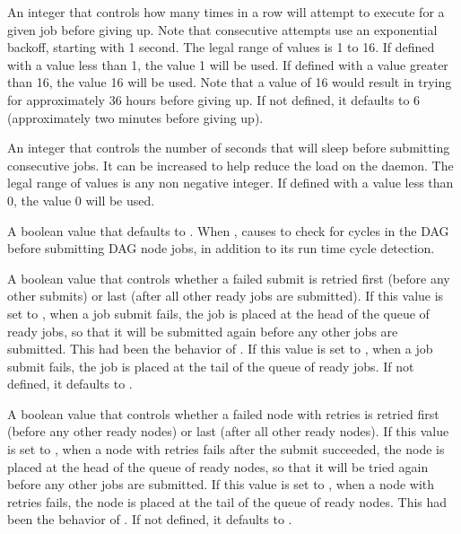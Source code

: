 \begin{description}
\label{param:DAGManMaxSubmitAttempts}
\item[\Macro{DAGMAN\_MAX\_SUBMIT\_ATTEMPTS}]
  An integer that controls how
  many times in a row  will attempt to execute
   for a given job before giving up.
  Note that consecutive attempts use an exponential backoff,
  starting with 1 second.
  The legal range of values is 1 to 16.
  If defined with a value less than 1, the  value 1 will be used.
  If defined with a value greater than 16, the value 16 will be used.
  Note that a value of 16 would result in  trying for
  approximately 36 hours before giving up.
  If not defined,
  it defaults to 6 (approximately two minutes before giving up).

\label{param:DAGManSubmitDelay}
\item[\Macro{DAGMAN\_SUBMIT\_DELAY}]
  An integer that controls the number of seconds that 
  will sleep before submitting consecutive jobs.  It can be increased to
  help reduce the load on the  daemon.  The legal range
  of values is any non negative integer.  If defined with a value less
  than 0, the value 0 will be used.

\label{param:DAGManStartupCycleDetect}
\item[\Macro{DAGMAN\_STARTUP\_CYCLE\_DETECT}]
  A boolean value that defaults to .
  When ,
  causes  to check for cycles in the DAG before
  submitting DAG node jobs,
  in addition to its run time cycle detection.

\label{param:DAGManRetrySubmitFirst}
\item[\Macro{DAGMAN\_RETRY\_SUBMIT\_FIRST}]
  A boolean value that controls whether a failed submit is retried first
  (before any other submits) or last (after all other ready jobs are
  submitted).  If this value is set to , when a job submit
  fails, the job is placed at the head of the queue of ready jobs, so
  that it will be submitted again before any other jobs are submitted.
  This had been the behavior of .
  If this value is set to , when a job submit fails, the job
  is placed at the tail of the queue of ready jobs.
  If not defined, it defaults to .

\label{param:DAGManRetryNodeFirst}
\item[\Macro{DAGMAN\_RETRY\_NODE\_FIRST}]
  A boolean value that controls whether a failed node with retries
  is retried first (before any other ready nodes) or last (after all
  other ready nodes).  If this value is set to , when a
  node with retries fails after the submit succeeded, the node is
  placed at the head of the queue of ready nodes, so that it will be
  tried again before any other jobs are submitted.  If this value is
  set to , when a node with retries fails, the node
  is placed at the tail of the queue of ready nodes.
  This had been the behavior of .
  If not defined, it defaults to .


\end{description}

